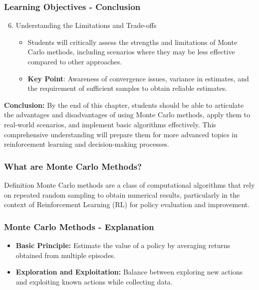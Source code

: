 \documentclass[aspectratio=169]{beamer}
\begin{document}
\begin{frame}[fragile]
    \frametitle{Learning Objectives - Conclusion}
    \begin{enumerate}
        \setcounter{enumi}{5}
        \item Understanding the Limitations and Trade-offs
        \begin{itemize}
            \item Students will critically assess the strengths and limitations of Monte Carlo methods, including scenarios where they may be less effective compared to other approaches.
            \item \textbf{Key Point}: Awareness of convergence issues, variance in estimates, and the requirement of sufficient samples to obtain reliable estimates.
        \end{itemize}
    \end{enumerate}
    
    \textbf{Conclusion:} By the end of this chapter, students should be able to articulate the advantages and disadvantages of using Monte Carlo methods, apply them to real-world scenarios, and implement basic algorithms effectively. This comprehensive understanding will prepare them for more advanced topics in reinforcement learning and decision-making processes.
\end{frame}

\begin{frame}[fragile]
    \frametitle{What are Monte Carlo Methods?}
    \begin{block}{Definition}
        Monte Carlo methods are a class of computational algorithms that rely on repeated random sampling to obtain numerical results, particularly in the context of Reinforcement Learning (RL) for policy evaluation and improvement.
    \end{block}
\end{frame}

\begin{frame}[fragile]
    \frametitle{Monte Carlo Methods - Explanation}
    \begin{itemize}
        \item \textbf{Basic Principle:} Estimate the value of a policy by averaging returns obtained from multiple episodes.
        \item \textbf{Exploration and Exploitation:} Balance between exploring new actions and exploiting known actions while collecting data.
    \end{itemize}
\end{frame}
\end{document}
